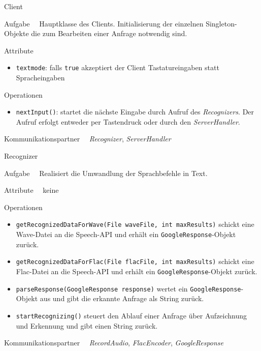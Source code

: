 \pagebreak[4]
\begin{class}{10}{Client}
\item[Aufgabe]~\
Hauptklasse des Clients. Initialisierung der einzelnen Singleton-Objekte die zum
Bearbeiten einer Anfrage notwendig sind.
\item[Attribute]~\
\begin{itemize}
  \item \texttt{textmode}: falls \texttt{true} akzeptiert der Client
  Tastatureingaben statt Spracheingaben
\end{itemize}
\item[Operationen]~\
\begin{itemize}
  \item \texttt{nextInput()}: startet die nächste Eingabe durch Aufruf des
  \textit{Recognizers}. Der Aufruf erfolgt entweder per Tastendruck oder durch
  den \textit{ServerHandler}.
\end{itemize}
\item[Kommunikationspartner]~\
  \textit{Recognizer}, \textit{ServerHandler}
\end{class}

\begin{class}{10}{Recognizer}
\item[Aufgabe]~\
Realisiert die Umwandlung der Sprachbefehle in Text.
\item[Attribute]~\
keine
\item[Operationen]~\
\begin{itemize}
    \item \texttt{getRecognizedDataForWave(File waveFile, int maxResults)}
    schickt eine Wave-Datei an die Speech-API und erhält ein
    \texttt{GoogleResponse}-Objekt zurück.
    \item \texttt{getRecognizedDataForFlac(File flacFile, int maxResults)}
    schickt eine Flac-Datei an die Speech-API und erhält ein 
    \texttt{GoogleResponse}-Objekt zurück.
    \item \texttt{parseResponse(GoogleResponse response)} wertet ein
    \texttt{GoogleResponse}-Objekt aus und gibt die erkannte Anfrage als String
    zurück.
    \item \texttt{startRecognizing()} steuert den Ablauf einer Anfrage über
    Aufzeichnung und Erkennung und gibt einen String zurück.
\end{itemize}
\item[Kommunikationspartner]~\
\textit{RecordAudio}, \textit{FlacEncoder}, \textit{GoogleResponse}
\end{class}

